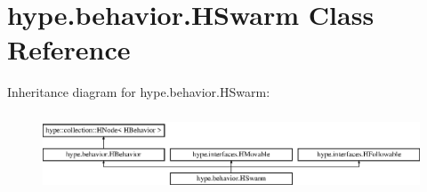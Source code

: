 \hypertarget{classhype_1_1behavior_1_1_h_swarm}{\section{hype.\-behavior.\-H\-Swarm Class Reference}
\label{classhype_1_1behavior_1_1_h_swarm}
}
Inheritance diagram for hype.\-behavior.\-H\-Swarm\-:\begin{figure}[H]
\begin{center}
\leavevmode
\includegraphics[height=2.362869cm]{classhype_1_1behavior_1_1_h_swarm}
\end{center}
\end{figure}
